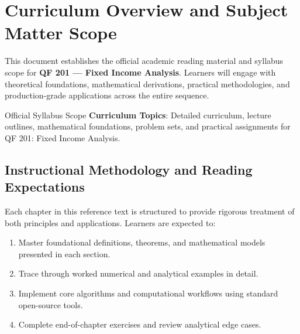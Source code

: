 \section{Curriculum Overview and Subject Matter Scope}

This document establishes the official academic reading material and syllabus scope for \textbf{QF 201 --- Fixed Income Analysis}. Learners will engage with theoretical foundations, mathematical derivations, practical methodologies, and production-grade applications across the entire sequence.

\begin{InsightBox}{Official Syllabus Scope}
  \textbf{Curriculum Topics}: Detailed curriculum, lecture outlines, mathematical foundations, problem sets, and practical assignments for QF 201: Fixed Income Analysis.
\end{InsightBox}

\subsection{Instructional Methodology and Reading Expectations}

Each chapter in this reference text is structured to provide rigorous treatment of both principles and applications. Learners are expected to:
\begin{enumerate}
  \item Master foundational definitions, theorems, and mathematical models presented in each section.
  \item Trace through worked numerical and analytical examples in detail.
  \item Implement core algorithms and computational workflows using standard open-source tools.
  \item Complete end-of-chapter exercises and review analytical edge cases.
\end{enumerate}

